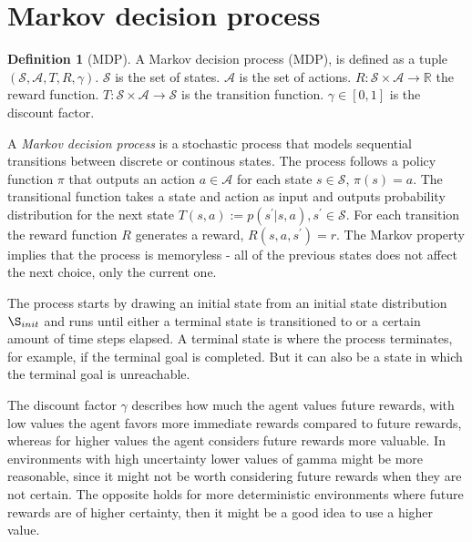 \documentclass[12pt,A4]{report}
\theoremstyle{definition}
\newtheorem{definition}{Definition}[section]
\begin{document}
\section{Markov decision process}
\begin{definition}[MDP]
    A Markov decision process (MDP), is defined as a tuple $(\mathcal{S}, \mathcal{A}, T, R, \gamma)$. $\mathcal{S}$ is the set of states. $\mathcal{A}$ is the set of actions. $R: \mathcal{S} \times \mathcal{A} \rightarrow \mathbb{R}$ the reward function. $T: \mathcal{S} \times \mathcal{A} \rightarrow \mathcal{S}$ is the transition function. $\gamma \in [0, 1]$ is the discount factor.
\end{definition}

A \textit{Markov decision process} is a stochastic process that models sequential transitions between discrete or continous states. The process follows a policy function $\pi$ that outputs an action $a \in \mathcal{A}$ for each state $s \in \mathcal{S}$, $\pi(s) = a$. The transitional function takes a state and action as input and outputs probability distribution for the next state $T(s,a) := p(s^\prime|s, a), s^\prime \in \mathcal{S}$. For each transition  the reward function $R$  generates a reward, $R(s, a, s^\prime) = r$. The Markov property implies that the process is memoryless - all of the previous states does not affect the next choice, only the current one. 

The process starts by drawing an initial state from an initial state distribution $\S_{init}$ and runs until either a terminal state is transitioned to or a certain amount of time steps elapsed. A terminal state is where the process terminates, for example, if the terminal goal is completed. But it can also be a state in which the terminal goal is unreachable.

The discount factor $\gamma$ describes how much the agent values future rewards, with low values the agent favors more immediate rewards compared to future rewards, whereas for higher values the agent considers future rewards more valuable. In environments with high uncertainty lower values of gamma might be more reasonable, since it might not be worth considering future rewards when they are not certain. The opposite holds for more deterministic environments where future rewards are of higher certainty, then it might be a good idea to use a higher value.
\end{document}
